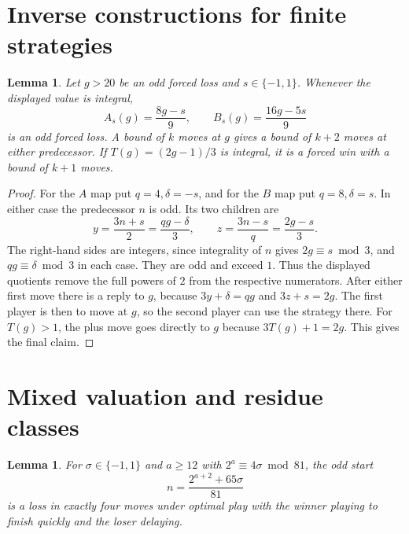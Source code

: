 \documentclass[11pt]{article}
\newtheorem{lemma}[theorem]{Lemma}
\begin{document}
\section{Inverse constructions for finite strategies}

\begin{lemma}\label{lem:diamond}
Let \(g>20\) be an odd forced loss and \(s\in\{-1,1\}\). Whenever the displayed value is integral,
\[
 A_s(g)=\frac{8g-s}{9},\qquad B_s(g)=\frac{16g-5s}{9}
\]
is an odd forced loss. A bound of \(k\) moves at \(g\) gives a bound of \(k+2\) moves at either predecessor. If \(T(g)=(2g-1)/3\) is integral, it is a forced win with a bound of \(k+1\) moves.
\end{lemma}

\begin{proof}
For the \(A\) map put \(q=4,\delta=-s\), and for the \(B\) map put \(q=8,\delta=s\). In either case the predecessor \(n\) is odd. Its two children are
\[
 y=\frac{3n+s}{2}=\frac{qg-\delta}{3},\qquad
 z=\frac{3n-s}{q}=\frac{2g-s}{3}.
\]
The right-hand sides are integers, since integrality of \(n\) gives \(2g\equiv s\bmod3\), and \(qg\equiv\delta\bmod3\) in each case. They are odd and exceed \(1\). Thus the displayed quotients remove the full powers of \(2\) from the respective numerators. After either first move there is a reply to \(g\), because \(3y+\delta=qg\) and \(3z+s=2g\). The first player is then to move at \(g\), so the second player can use the strategy there. For \(T(g)>1\), the plus move goes directly to \(g\) because \(3T(g)+1=2g\). This gives the final claim.
\end{proof}

\section{Mixed valuation and residue classes}

\begin{lemma}\label{lem:four}
For \(\sigma\in\{-1,1\}\) and \(a\ge12\) with \(2^a\equiv4\sigma\bmod81\), the odd start
\[
 n=\frac{2^{a+2}+65\sigma}{81}
\]
is a loss in exactly four moves under optimal play with the winner playing to finish quickly and the loser delaying.
\end{lemma}
\end{document}
